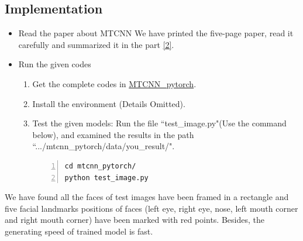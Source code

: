 \documentclass[journal, a4paper]{IEEEtran}
\begin{document}
\subsection{Implementation}
\begin{itemize}
	\item Read the paper about MTCNN \cite{1}
    We have printed the five-page paper, read it carefully and summarized it in the part \ref{2}. 
   \item Run the given codes 
   \begin{enumerate}
   	\item Get the complete codes in \href{https://github.com/wujiaju/mtcnn_pytorch}{MTCNN\_pytorch}. 
   	\item Install the environment (Details Omitted).
   	\item Test the given models: Run the file ``test\_image.py"(Use the command below), and examined the results in the path ``.../mtcnn\_pytorch/data/you\_result/". 
%
\begin{lstlisting}[mathescape, includerangemarker=false,backgroundcolor=\color{yellow!15},  frame=single,numbers=left,firstnumber=1 ] 
cd mtcnn_pytorch/
python test_image.py
 \end{lstlisting}
\end{enumerate}
\end{itemize} \par
\indent We have found all the faces of test images have been framed in a rectangle and five facial landmarks positions of faces (left eye, right eye, nose, left mouth corner and right mouth corner) have been marked with red points. Besides, the generating speed of trained model is fast.

\end{document}

